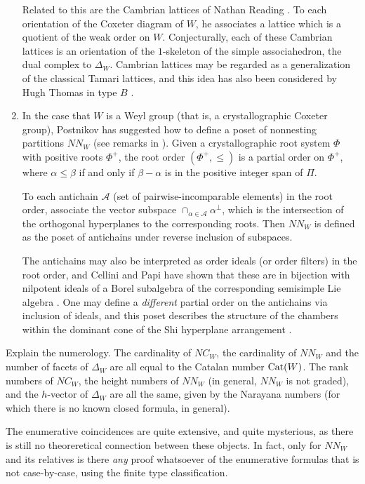 \documentclass[12pt,letterpaper, reqno]{amsart}
\newcommand{\Cat}{{\rm Cat}}
\newcommand{\A}{\mathcal A}
\begin{document}
\begin{enumerate}
Related to this are the {\sf Cambrian lattices} of Nathan Reading
\cite{reading:cambrian}. To each orientation of the Coxeter diagram of
$W$, he associates a lattice which is a quotient of the weak order on
$W$. Conjecturally, each of these Cambrian lattices is an orientation
of the $1$-skeleton of the {\sf simple associahedron}, the dual complex
to $\Delta_W$. Cambrian lattices may be regarded as a generalization of
the classical Tamari lattices, and this idea has also been considered
by Hugh Thomas in type $B$ \cite{thomas}.


\item In the case that $W$ is a Weyl group (that is, a crystallographic
Coxeter group), Postnikov has suggested how to define a poset of {\sf
nonnesting partitions} $NN_W$ (see remarks in \cite{reiner}). Given
a crystallographic root system $\Phi$ with positive roots $\Phi^+$,
the {\sf root order} $(\Phi^+,\leq)$ is a partial order on $\Phi^+$,
where $\alpha\leq\beta$ if and only if $\beta-\alpha$ is in the positive
integer span of $\Pi$.

To each antichain $\A$ (set of pairwise-incomparable elements) in
the root order, associate the vector subspace $\cap_{\alpha\in\A}
\alpha^{\perp}$, which is the intersection of the orthogonal hyperplanes
to the corresponding roots. Then $NN_W$ is defined as the poset of
antichains under reverse inclusion of subspaces.

The antichains may also be interpreted as order ideals (or order
filters) in the root order, and Cellini and Papi have shown that these
are in bijection with nilpotent ideals of a Borel subalgebra of the
corresponding semisimple Lie algebra \cite{cellini-papi}. One may define
a {\em different} partial order on the antichains via inclusion of ideals,
and this poset describes the structure of the chambers within the dominant
cone of the Shi hyperplane arrangement \cite{shi}.

\end{enumerate}

\begin{problemblock}

\begin{problem}
\label{central:one}
Explain the numerology. The cardinality of $NC_W$, the cardinality of
$NN_W$ and the number of facets of $\Delta_W$ are all equal to the Catalan
number $\Cat(W)$. The rank numbers of $NC_W$, the height numbers of $NN_W$
(in general, $NN_W$ is not graded), and the $h$-vector of $\Delta_W$ are
all the same, given by the {\sf Narayana numbers} (for which there is no
known closed formula, in general).
\end{problem}

 The enumerative coincidences are quite
extensive, and quite mysterious, as there is  still no theoreretical
connection between these objects.  In fact, only for $NN_W$ and its
relatives is there {\em any} proof whatsoever of the enumerative formulas
that is not case-by-case, using the finite type classification.
\end{problemblock}
\end{document}

